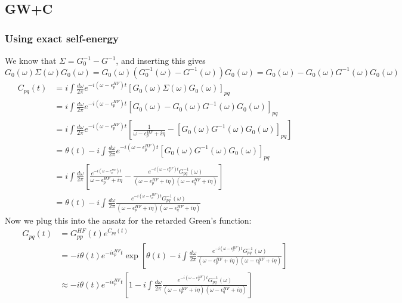 \subsection{GW+C}
\subsubsection{Using exact self-energy}
We know that $\Sigma = G_0^{-1} - G^{-1}$, and inserting this gives\\ $G_0(\omega) \Sigma(\omega) G_0(\omega) = G_0(\omega) \left(G_0^{-1}(\omega) - G^{-1}(\omega)\right) G_0(\omega) = G_0(\omega) - G_0(\omega) G^{-1}(\omega) G_0(\omega)$
\begin{align}
	C_{pq}(t) &= i \int \frac{d\omega}{2\pi} e^{-i(\omega-\epsilon_p^{HF})t} \left[G_0(\omega) \Sigma(\omega) G_0(\omega)\right]_{pq} \\
&= i \int \frac{d\omega}{2\pi} e^{-i(\omega-\epsilon_p^{HF})t} \left[G_0(\omega) - G_0(\omega) G^{-
1}(\omega) G_0(\omega)\right]_{pq} \\
&= i \int \frac{d\omega}{2\pi} e^{-i(\omega-\epsilon_p^{HF})t} \left[\frac{1}{\omega - \epsilon_p^{HF} + i\eta} - \left[G_0(\omega) G^{-1}(\omega) G_0(\omega)\right]_{pq}\right] \\
&= \theta(t) - i \int \frac{d\omega}{2\pi} e^{-i(\omega-\epsilon_p^{HF})t}  \left[G_0(\omega) G^{-1}(\omega) G_0(\omega)\right]_{pq}
\label{restart} \\
&= i \int \frac{d\omega}{2\pi}  \left[\frac{e^{-i(\omega-\epsilon_p^{HF})t}}{\omega - \epsilon_p^{HF} + i\eta} - \frac{e^{-i(\omega-\epsilon_p^{HF})t}G^{-1}_{pq}(\omega)}{(\omega - \epsilon_p^{HF} + i\eta)(\omega - \epsilon_q^{HF} + i\eta)}\right] \\
&= \theta  (t) - i \int \frac{d\omega}{2\pi}  \frac{e^{-i(\omega-\epsilon_p^{HF})t}G^{-1}_{pq}(\omega)}{(\omega - \epsilon_p^{HF} + i\eta)(\omega - \epsilon_q^{HF} + i\eta)} 
\end{align}
Now we plug this into the ansatz for the retarded Green's function:
\begin{align}
    G_{pq}(t) &= G_{pp}^{HF}(t) e^{C_{pq}(t)} \\
&= -i \theta(t) e^{- i \epsilon_p^{HF} t} \exp \left[\theta(t) - i \int \frac{d\omega}{2\pi}  \frac{e^{-i(\omega-\epsilon_p^{HF})t}G^{-1}_{pq}(\omega)}{(\omega - \epsilon_p^{HF} + i\eta)(\omega - \epsilon_q^{HF} + i\eta)}\right] \\
&\approx -i \theta(t) e^{- i \epsilon_p^{HF} t} \left[1 - i \int \frac{d\omega}{2\pi}  \frac{e^{-i(\omega-\epsilon_p^{HF})t}G^{-1}_{pq}(\omega)}{(\omega - \epsilon_p^{HF} + i\eta)(\omega - \epsilon_q^{HF} + i\eta)}\right] 
\end{align}
